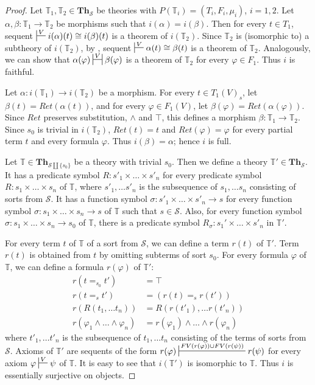 \documentclass[reqno]{amsart}
\theoremstyle{definition}
\theoremstyle{remark}
\newcommand{\cat}[1]{\mathbf{#1}}
\newcommand{\Th}{\cat{Th}}
\numberwithin{figure}{section}
\begin{document}
\begin{proof}
Let $\mathbb{T}_1,\mathbb{T}_2 \in \Th_\mathcal{S}$ be theories with $P(\mathbb{T}_i) = (T_i,F_i,\mu_i)$, $i = 1,2$.
Let $\alpha,\beta : \mathbb{T}_1 \to \mathbb{T}_2$ be morphisms such that $i(\alpha) = i(\beta)$.
Then for every $t \in T_1$, sequent $\sststile{}{V} i(\alpha)(t) \cong i(\beta)(t)$ is a theorem of $i(\mathbb{T}_2)$.
Since $\mathbb{T}_2$ is (isomorphic to) a subtheory of $i(\mathbb{T}_2)$, by , sequent $\sststile{}{V} \alpha(t) \cong \beta(t)$ is a theorem of $\mathbb{T}_2$.
Analogously, we can show that $\alpha(\varphi) \ssststile{}{V} \beta(\varphi)$ is a theorem of $\mathbb{T}_2$ for every $\varphi \in F_1$.
Thus $i$ is faithful.

Let $\alpha : i(\mathbb{T}_1) \to i(\mathbb{T}_2)$ be a morphism.
For every $t \in T_1(V)_s$, let $\beta(t) = Ret(\alpha(t))$, and for every $\varphi \in F_1(V)$, let $\beta(\varphi) = Ret(\alpha(\varphi))$.
Since $Ret$ preserves substitution, $\land$ and $\top$, this defines a morphism $\beta : \mathbb{T}_1 \to \mathbb{T}_2$.
Since $s_0$ is trivial in $i(\mathbb{T}_2)$, $Ret(t) = t$ and $Ret(\varphi) = \varphi$ for every partial term $t$ and every formula $\varphi$.
Thus $i(\beta) = \alpha$; hence $i$ is full.

Let $\mathbb{T} \in \Th_{\mathcal{S} \amalg \{ s_0 \}}$ be a theory with trivial $s_0$.
Then we define a theory $\mathbb{T}' \in \Th_\mathcal{S}$.
It has a predicate symbol $R : s'_1 \times \ldots \times s'_n$ for every predicate symbol $R : s_1 \times \ldots \times s_n$ of $\mathbb{T}$,
    where $s'_1, \ldots s'_n$ is the subsequence of $s_1, \ldots s_n$ consisting of sorts from $\mathcal{S}$.
It has a function symbol $\sigma : s'_1 \times \ldots \times s'_n \to s$ for every function symbol
    $\sigma : s_1 \times \ldots \times s_n \to s$ of $\mathbb{T}$ such that $s \in \mathcal{S}$.
Also, for every function symbol $\sigma : s_1 \times \ldots \times s_n \to s_0$ of $\mathbb{T}$,
    there is a predicate symbol $R_\sigma : s_1' \times \ldots \times s'_n$ in $\mathbb{T}'$.

For every term $t$ of $\mathbb{T}$ of a sort from $\mathcal{S}$, we can define a term $r(t)$ of $\mathbb{T}'$.
Term $r(t)$ is obtained from $t$ by omitting subterms of sort $s_0$.
For every formula $\varphi$ of $\mathbb{T}$, we can define a formula $r(\varphi)$ of $\mathbb{T}'$:
\begin{align*}
r(t =_{s_0} t') & = \top \\
r(t =_s t') & = (r(t) =_s r(t')) \\
r(R(t_1, \ldots t_n)) & = R(r(t'_1), \ldots r(t'_n)) \\
r(\varphi_1 \land \ldots \land \varphi_n) & = r(\varphi_1) \land \ldots \land r(\varphi_n)
\end{align*}
where $t'_1, \ldots t'_n$ is the subsequence of $t_1, \ldots t_n$ consisting of the terms of sorts from $\mathcal{S}$.
Axioms of $\mathbb{T}'$ are sequents of the form $r(\varphi) \sststile{}{FV(r(\varphi)) \cup FV(r(\psi))} r(\psi)$ for every axiom $\varphi \sststile{}{V} \psi$ of $\mathbb{T}$.
It is easy to see that $i(\mathbb{T}')$ is isomorphic to $\mathbb{T}$.
Thus $i$ is essentially surjective on objects.
\end{proof}
\end{document}

